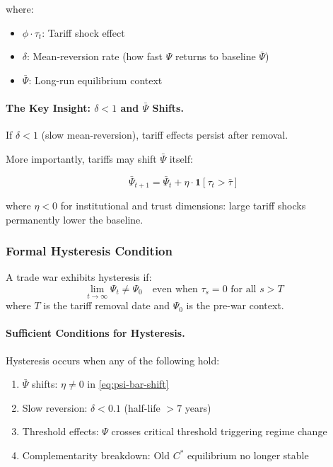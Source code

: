 where:
\begin{itemize}
    \item $\phi \cdot \tau_t$: Tariff shock effect
    \item $\delta$: Mean-reversion rate (how fast $\Psi$ returns to baseline $\bar{\Psi}$)
    \item $\bar{\Psi}$: Long-run equilibrium context
\end{itemize}

\paragraph{The Key Insight: $\delta < 1$ and $\bar{\Psi}$ Shifts.}

If $\delta < 1$ (slow mean-reversion), tariff effects persist after removal.

More importantly, tariffs may shift $\bar{\Psi}$ itself:

\begin{equation}
\bar{\Psi}_{t+1} = \bar{\Psi}_t + \eta \cdot \mathbf{1}[\tau_t > \bar{\tau}]
\label{eq:psi-bar-shift}
\end{equation}

where $\eta < 0$ for institutional and trust dimensions: large tariff shocks 
permanently lower the baseline.

\subsubsection{Formal Hysteresis Condition}

\begin{definition}
A trade war exhibits hysteresis if:
\begin{equation}
\lim_{t \to \infty} \Psi_t \neq \Psi_0 \quad \text{even when } \tau_s = 0 \text{ for all } s > T
\end{equation}
where $T$ is the tariff removal date and $\Psi_0$ is the pre-war context.
\end{definition}

\paragraph{Sufficient Conditions for Hysteresis.}
Hysteresis occurs when any of the following hold:
\begin{enumerate}
    \item $\bar{\Psi}$ shifts: $\eta \neq 0$ in \eqref{eq:psi-bar-shift}
    \item Slow reversion: $\delta < 0.1$ (half-life $> 7$ years)
    \item Threshold effects: $\Psi$ crosses critical threshold triggering regime change
    \item Complementarity breakdown: Old $C^*$ equilibrium no longer stable
\end{enumerate}

